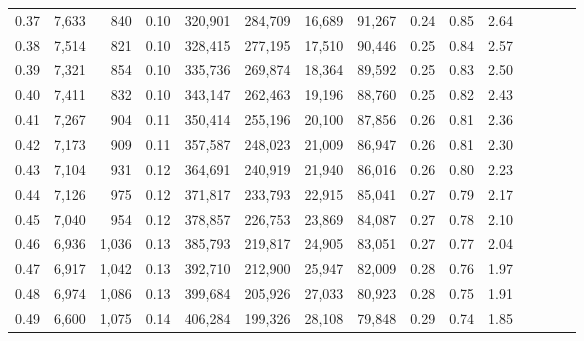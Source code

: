 \begin{tabular}{rrrcrrrrrrrrrrr}
0.37 &   7,633 &    840 &                                       0.10 &  320,901 &  284,709 &   16,689 &   91,267 &  0.24 &  0.85 &                         2.64 \\
0.38 &   7,514 &    821 &                                       0.10 &  328,415 &  277,195 &   17,510 &   90,446 &  0.25 &  0.84 &                         2.57 \\
0.39 &   7,321 &    854 &                                       0.10 &  335,736 &  269,874 &   18,364 &   89,592 &  0.25 &  0.83 &                         2.50 \\
0.40 &   7,411 &    832 &                                       0.10 &  343,147 &  262,463 &   19,196 &   88,760 &  0.25 &  0.82 &                         2.43 \\
0.41 &   7,267 &    904 &                                       0.11 &  350,414 &  255,196 &   20,100 &   87,856 &  0.26 &  0.81 &                         2.36 \\
0.42 &   7,173 &    909 &                                       0.11 &  357,587 &  248,023 &   21,009 &   86,947 &  0.26 &  0.81 &                         2.30 \\
0.43 &   7,104 &    931 &                                       0.12 &  364,691 &  240,919 &   21,940 &   86,016 &  0.26 &  0.80 &                         2.23 \\
0.44 &   7,126 &    975 &                                       0.12 &  371,817 &  233,793 &   22,915 &   85,041 &  0.27 &  0.79 &                         2.17 \\
0.45 &   7,040 &    954 &                                       0.12 &  378,857 &  226,753 &   23,869 &   84,087 &  0.27 &  0.78 &                         2.10 \\
0.46 &   6,936 &  1,036 &                                       0.13 &  385,793 &  219,817 &   24,905 &   83,051 &  0.27 &  0.77 &                         2.04 \\
0.47 &   6,917 &  1,042 &                                       0.13 &  392,710 &  212,900 &   25,947 &   82,009 &  0.28 &  0.76 &                         1.97 \\
0.48 &   6,974 &  1,086 &                                       0.13 &  399,684 &  205,926 &   27,033 &   80,923 &  0.28 &  0.75 &                         1.91 \\
0.49 &   6,600 &  1,075 &                                       0.14 &  406,284 &  199,326 &   28,108 &   79,848 &  0.29 &  0.74 &                         1.85 \\

\end{tabular}
